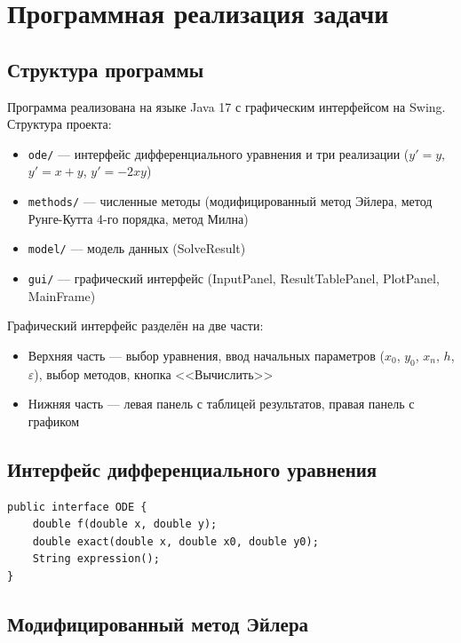 \section{Программная реализация задачи}

\subsection{Структура программы}

Программа реализована на языке Java 17 с графическим интерфейсом на Swing. Структура проекта:

\begin{itemize}
\item \texttt{ode/} — интерфейс дифференциального уравнения и три реализации ($y' = y$, $y' = x + y$, $y' = -2xy$)
\item \texttt{methods/} — численные методы (модифицированный метод Эйлера, метод Рунге-Кутта 4-го порядка, метод Милна)
\item \texttt{model/} — модель данных (SolveResult)
\item \texttt{gui/} — графический интерфейс (InputPanel, ResultTablePanel, PlotPanel, MainFrame)
\end{itemize}

Графический интерфейс разделён на две части:
\begin{itemize}
\item Верхняя часть — выбор уравнения, ввод начальных параметров ($x_0$, $y_0$, $x_n$, $h$, $\varepsilon$), выбор методов, кнопка <<Вычислить>>
\item Нижняя часть — левая панель с таблицей результатов, правая панель с графиком
\end{itemize}

\subsection{Интерфейс дифференциального уравнения}

\begin{lstlisting}[style=javaStyle, label=code:ode]
public interface ODE {
    double f(double x, double y);
    double exact(double x, double x0, double y0);
    String expression();
}
\end{lstlisting}

\subsection{Модифицированный метод Эйлера}


